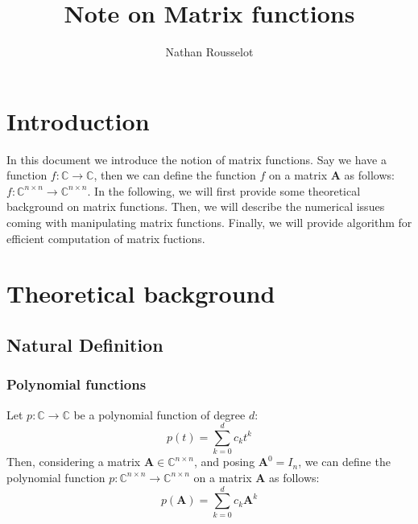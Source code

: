 \documentclass[11pt]{article}
\title{Note on Matrix functions} %
\author{Nathan Rousselot}
\numberwithin{equation}{section}
\begin{document}
\maketitle

\section{Introduction}
In this document we introduce the notion of matrix functions. Say we have a function $f:\mathbb{C}\rightarrow\mathbb{C}$, then we can define the function $f$ on a matrix $\mathbf{A}$ as follows: $f:\mathbb{C}^{n\times n}\rightarrow\mathbb{C}^{n\times n}$. In the following, we will first provide some theoretical background on matrix functions. Then, we will describe the numerical issues coming with manipulating matrix functions. Finally, we will provide algorithm for efficient computation of matrix fuctions.

\section{Theoretical background}
\subsection{Natural Definition}
\subsubsection*{Polynomial functions}
Let $p:\mathbb{C}\rightarrow\mathbb{C}$ be a polynomial function of degree $d$:
\begin{equation}
    p(t) = \sum_{k=0}^d c_k t^k
\end{equation}
Then, considering a matrix $\mathbf{A}\in\mathbb{C}^{n\times n}$, and posing $\mathbf{A}^0 = I_n$, we can define the polynomial function $p:\mathbb{C}^{n\times n}\rightarrow\mathbb{C}^{n\times n}$ on a matrix $\mathbf{A}$ as follows:
\begin{equation}
    p(\mathbf{A}) = \sum_{k=0}^d c_k \mathbf{A}^k
\end{equation}
\end{document}

